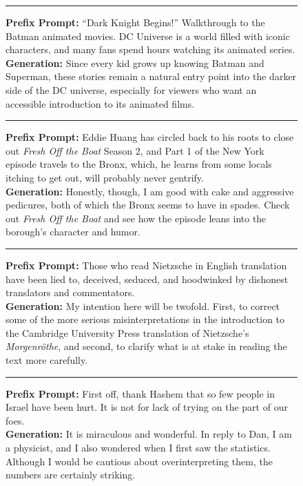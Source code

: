 \begin{figure}[t]
{\begin{minipage}{0.97\textwidth}
\begin{minipage}[t]{0.485\textwidth}
    \vspace{0.7em}
    \hrule
    \vspace{0.7em}

    \textbf{Prefix Prompt:} ``Dark Knight Begins!'' Walkthrough to the Batman animated movies. DC Universe is a world filled with iconic characters, and many fans spend hours watching its animated series.\\
    \textbf{Generation:} Since every kid grows up knowing Batman and Superman, these stories remain a natural entry point into the darker side of the DC universe, especially for viewers who want an accessible introduction to its animated films.

    \vspace{0.7em}
    \hrule
    \vspace{0.7em}

    \textbf{Prefix Prompt:} Eddie Huang has circled back to his roots to close out \textit{Fresh Off the Boat} Season 2, and Part 1 of the New York episode travels to the Bronx, which, he learns from some locals itching to get out, will probably never gentrify.\\
    \textbf{Generation:} Honestly, though, I am good with cake and aggressive pedicures, both of which the Bronx seems to have in spades. Check out \textit{Fresh Off the Boat} and see how the episode leans into the borough's character and humor.

    \vspace{0.7em}
    \hrule
    \vspace{0.7em}

    \textbf{Prefix Prompt:} Those who read Nietzsche in English translation have been lied to, deceived, seduced, and hoodwinked by dishonest translators and commentators.\\
    \textbf{Generation:} My intention here will be twofold. First, to correct some of the more serious misinterpretations in the introduction to the Cambridge University Press translation of Nietzsche's \textit{Morgenr\"othe}, and second, to clarify what is at stake in reading the text more carefully.

    \vspace{0.7em}
    \hrule
    \vspace{0.7em}

    \textbf{Prefix Prompt:} First off, thank Hashem that so few people in Israel have been hurt. It is not for lack of trying on the part of our foes.\\
    \textbf{Generation:} It is miraculous and wonderful. In reply to Dan, I am a physicist, and I also wondered when I first saw the statistics. Although I would be cautious about overinterpreting them, the numbers are certainly striking.


\end{minipage}
\end{minipage}}
\end{figure}
